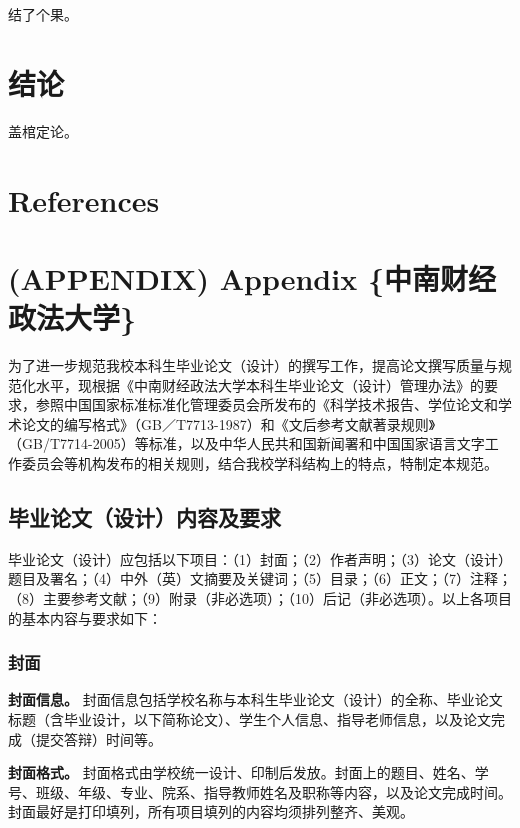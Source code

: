 \documentclass[doublesided]{Style/ucasthesis}%
\begin{document}
结了个果。

\hypertarget{conclusion}{%
\chapter{结论}\label{conclusion}}

盖棺定论。

\hypertarget{references}{%
\chapter*{References}\label{references}}



\hypertarget{appendix-appendix-}{%
\chapter{(APPENDIX) Appendix \{中南财经政法大学\}}\label{appendix-appendix-}}

为了进一步规范我校本科生毕业论文（设计）的撰写工作，提高论文撰写质量与规范化水平，现根据《中南财经政法大学本科生毕业论文（设计）管理办法》的要求，参照中国国家标准标准化管理委员会所发布的《科学技术报告、学位论文和学术论文的编写格式》（GB／T7713-1987）和《文后参考文献著录规则》（GB/T7714-2005）等标准，以及中华人民共和国新闻署和中国国家语言文字工作委员会等机构发布的相关规则，结合我校学科结构上的特点，特制定本规范。

\hypertarget{section-12}{%
\section{毕业论文（设计）内容及要求}\label{section-12}}

毕业论文（设计）应包括以下项目：（1）封面；（2）作者声明；（3）论文（设计）题目及署名；（4）中外（英）文摘要及关键词；（5）目录；（6）正文；（7）注释；（8）主要参考文献；（9）附录（非必选项）；（10）后记（非必选项）。以上各项目的基本内容与要求如下：

\hypertarget{section-13}{%
\subsection{封面}\label{section-13}}

\textbf{封面信息。} 封面信息包括学校名称与本科生毕业论文（设计）的全称、毕业论文标题（含毕业设计，以下简称论文）、学生个人信息、指导老师信息，以及论文完成（提交答辩）时间等。

\textbf{封面格式。} 封面格式由学校统一设计、印制后发放。封面上的题目、姓名、学号、班级、年级、专业、院系、指导教师姓名及职称等内容，以及论文完成时间。封面最好是打印填列，所有项目填列的内容均须排列整齐、美观。
\end{document}
